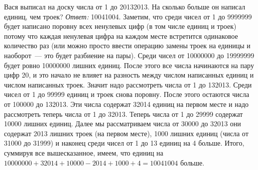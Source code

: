\problem
Вася выписал на доску числа от 1 до 20132013.
На сколько больше он написал единиц, чем троек?
\solution
\emph{Ответ:} 10041004.
Заметим, что среди чисел от 1 до 9999999 будет написано поровну всех ненулевых
цифр (в том числе единиц и троек) потому что каждая ненулевая цифра на каждом
месте встретится одинаковое количество раз (или можно просто ввести операцию
замены троек на единицы и наоборот~--- это будет разбиение на пары).
Среди чисел от 10000000 до 19999999 будет ровно 10000000 лишних единиц.
После этого все числа начинаются на пару цифр 20, и это начало не влияет на
разность между числом написанных единиц и числом написанных троек.
Значит надо рассмотреть числа от 1 до 132013.
Среди чисел от 1 до 99999 единиц и троек снова поровну.
После этого остаются числа от 100000 до 132013.
Эти числа содержат 32014 единиц на первом месте и надо рассмотреть теперь числа
от 1 до 32013.
Теперь числа от 1 до 29999 содержат 10000 лишних единиц.
Далее мы рассматриваем числа от 30000 до 32013 они содержат 2013 лишних троек
(на первом месте), 1000 лишних единиц (числа от 31000 до 31999) и наконец среди
чисел от 1 до 13 единиц на 4 больше.
Итого, суммируя все вышесказанное, имеем, что единиц на
$10000000 + 32014 + 10000 - 2014 + 1000 + 4 = 10041004$ больше.
\endproblem
